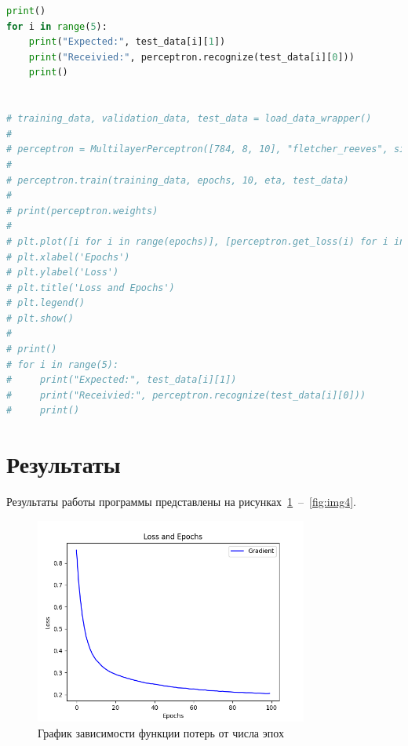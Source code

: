 \documentclass[a4paper, 14pt]{extarticle}
\begin{document}
\begin{lstlisting}[language={python},caption={Многослойный персептрон},label={lst:code1}]
print()
for i in range(5):
    print("Expected:", test_data[i][1])
    print("Receivied:", perceptron.recognize(test_data[i][0]))
    print()


# training_data, validation_data, test_data = load_data_wrapper()
#
# perceptron = MultilayerPerceptron([784, 8, 10], "fletcher_reeves", sigmoid, mse)
#
# perceptron.train(training_data, epochs, 10, eta, test_data)
#
# print(perceptron.weights)
#
# plt.plot([i for i in range(epochs)], [perceptron.get_loss(i) for i in range(epochs)], label='Fletcher-Reeves optimization', color='green')
# plt.xlabel('Epochs')
# plt.ylabel('Loss')
# plt.title('Loss and Epochs')
# plt.legend()
# plt.show()
#
# print()
# for i in range(5):
#     print("Expected:", test_data[i][1])
#     print("Receivied:", perceptron.recognize(test_data[i][0]))
#     print()

\end{lstlisting}

\section{Результаты}\label{Sect::res}

Результаты работы программы представлены на рисунках~\ref{fig:img1}~--~\ref{fig:img4}.   

\begin{figure}[!htb]
	\centering
	\includegraphics[width=0.8\textwidth]{img1}
\caption{График зависимости функции потерь от числа эпох}
\label{fig:img1}
\end{figure}
\end{document}

